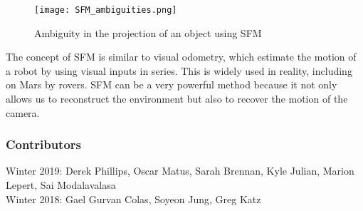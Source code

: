 \documentclass[twoside]{article}
\begin{document}
\begin{figure}[h!]
  \begin{center}
	\texttt{[image: SFM\_ambiguities.png]}
  \end{center}
  \caption{Ambiguity in the projection of an object using SFM}
  \label{amb}
\end{figure}

The concept of SFM is similar to visual odometry, which estimate the motion of a robot by using visual inputs in series. This is widely used in reality, including on Mars by rovers. SFM can be a very powerful method because it not only allows us to reconstruct the environment but also to recover the motion of the camera.

\newpage




\subsubsection*{Contributors}
Winter 2019: Derek Phillips, Oscar Matus, Sarah Brennan, Kyle Julian, Marion Lepert, Sai Modalavalasa
\\
Winter 2018: Gael Gurvan Colas, Soyeon Jung, Greg Katz
\end{document}
